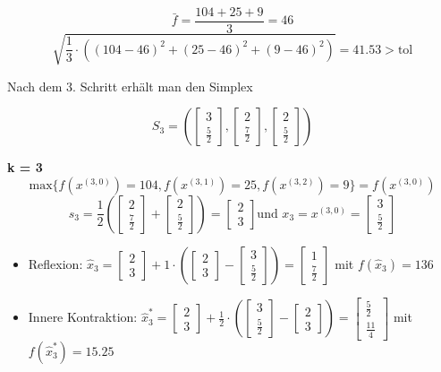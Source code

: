 \documentclass[a4paper, 12pt]{report}
\begin{document}
$$\bar f = \frac{104+25+9}{3} = 46$$
$$\sqrt{\frac{1}{3}\cdot \left((104 - 46)^2 + (25 - 46)^2 + (9 - 46)^2\right)} = 41.53 > \text{tol}$$

Nach dem 3. Schritt erhält man den Simplex

$$S_3 = \left(\begin{bmatrix}3\\\frac{5}{2}\end{bmatrix}, \begin{bmatrix}2\\\frac{7}{2}\end{bmatrix}, \begin{bmatrix}2\\\frac{5}{2}\end{bmatrix}\right)$$

\textbf{k = 3}\\
$$\text{max}\{f(x^{(3,0)}) = 104, f(x^{(3,1)}) = 25, f(x^{(3,2)}) = 9\} = f(x^{(3,0)})$$
$$s_3 = \frac{1}{2}\left(\begin{bmatrix}2\\\frac{7}{2}\end{bmatrix} + \begin{bmatrix}2\\\frac{5}{2}\end{bmatrix}\right) = \begin{bmatrix}2\\3\end{bmatrix} \text{und } x_3 = x^{(3,0)} = \begin{bmatrix}3\\\frac{5}{2}\end{bmatrix}$$
\begin{itemize}
\item Reflexion: $\hat x_3 = \begin{bmatrix}2\\3\end{bmatrix} + 1\cdot\left(\begin{bmatrix}2\\3\end{bmatrix} - \begin{bmatrix}3\\\frac{5}{2}\end{bmatrix}\right) = \begin{bmatrix}1\\\frac{7}{2}\end{bmatrix}$ mit $f(\hat x_3) = 136$
\item Innere Kontraktion: $\hat x_3^* = \begin{bmatrix}2\\3\end{bmatrix} + \frac{1}{2}\cdot\left(\begin{bmatrix}3\\\frac{5}{2}\end{bmatrix} - \begin{bmatrix}2\\3\end{bmatrix}\right) = \begin{bmatrix}\frac{5}{2}\\\frac{11}{4}\end{bmatrix}$ mit $f(\hat x_3^*) = 15.25$
\end{itemize}
\end{document}
